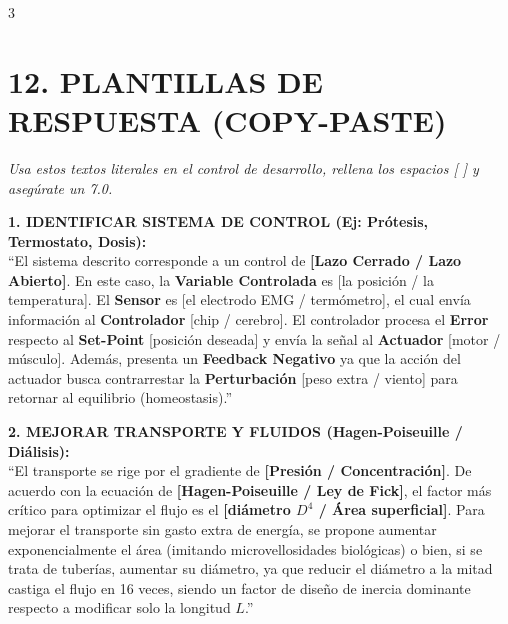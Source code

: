 \documentclass[11pt,landscape,letterpaper]{extarticle}
\begin{document}
\begin{multicols*}{3}
	\columnbreak %

	\section{12. PLANTILLAS DE RESPUESTA (COPY-PASTE)}
	\textit{Usa estos textos literales en el control de desarrollo, rellena los espacios [ ] y asegúrate un 7.0.}

	\begin{tcolorbox}[colback=tipsbg,colframe=myred,boxrule=1.2pt,arc=3pt,left=3pt,right=3pt,top=2pt,bottom=2pt]
		\textbf{1. IDENTIFICAR SISTEMA DE CONTROL (Ej: Prótesis, Termostato, Dosis):} \\
		``El sistema descrito corresponde a un control de \textbf{[Lazo Cerrado / Lazo Abierto]}. En este caso, la \textbf{Variable Controlada} es [la posición / la temperatura]. El \textbf{Sensor} es [el electrodo EMG / termómetro], el cual envía información al \textbf{Controlador} [chip / cerebro]. El controlador procesa el \textbf{Error} respecto al \textbf{Set-Point} [posición deseada] y envía la señal al \textbf{Actuador} [motor / músculo]. Además, presenta un \textbf{Feedback Negativo} ya que la acción del actuador busca contrarrestar la \textbf{Perturbación} [peso extra / viento] para retornar al equilibrio (homeostasis).''
	\end{tcolorbox}

	\begin{tcolorbox}[colback=tipsbg,colframe=myred,boxrule=1.2pt,arc=3pt,left=3pt,right=3pt,top=2pt,bottom=2pt]
		\textbf{2. MEJORAR TRANSPORTE Y FLUIDOS (Hagen-Poiseuille / Diálisis):} \\
		``El transporte se rige por el gradiente de \textbf{[Presión / Concentración]}. De acuerdo con la ecuación de \textbf{[Hagen-Poiseuille / Ley de Fick]}, el factor más crítico para optimizar el flujo es el \textbf{[diámetro $D^4$ / Área superficial]}. Para mejorar el transporte sin gasto extra de energía, se propone aumentar exponencialmente el área (imitando microvellosidades biológicas) o bien, si se trata de tuberías, aumentar su diámetro, ya que reducir el diámetro a la mitad castiga el flujo en 16 veces, siendo un factor de diseño de inercia dominante respecto a modificar solo la longitud $L$.''
	\end{tcolorbox}


\end{multicols*}
\end{document}
